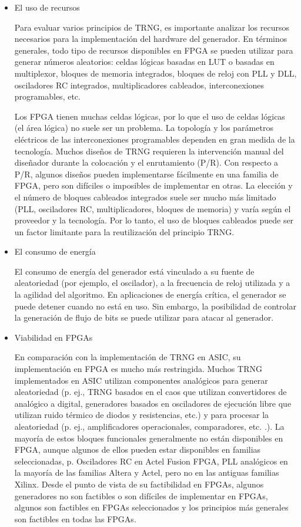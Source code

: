 \begin{itemize}
				\item El uso de recursos
				
					Para evaluar varios principios de TRNG, es importante analizar los recursos necesarios para la implementación del hardware del generador. En términos generales, todo tipo de recursos disponibles en FPGA se pueden utilizar para generar números aleatorios: celdas lógicas basadas en LUT o basadas en multiplexor, bloques de memoria integrados, bloques de reloj con PLL y DLL, osciladores RC integrados, multiplicadores cableados, interconexiones programables, etc.
					
					Los FPGA tienen muchas celdas lógicas, por lo que el uso de celdas lógicas (el área lógica) no suele ser un problema. La topología y los parámetros eléctricos de las interconexiones programables dependen en gran medida de la tecnología. Muchos diseños de TRNG requieren la intervención manual del diseñador durante la colocación y el enrutamiento (P/R). Con respecto a P/R, algunos diseños pueden implementarse fácilmente en una familia de FPGA, pero son difíciles o imposibles de implementar en otras. La elección y el número de bloques cableados integrados suele ser mucho más limitado (PLL, osciladores RC, multiplicadores, bloques de memoria) y varía según el proveedor y la tecnología. Por lo tanto, el uso de bloques cableados puede ser un factor limitante para la reutilización del principio TRNG.
				
				\item El consumo de energía
					
					El consumo de energía del generador está vinculado a su fuente de aleatoriedad (por ejemplo, el oscilador), a la frecuencia de reloj utilizada y a la agilidad del algoritmo. En aplicaciones de energía crítica, el generador se puede detener cuando no está en uso. Sin embargo, la posibilidad de controlar la generación de flujo de bits se puede utilizar para atacar al generador.
					
				\item Viabilidad en FPGAs
				
					En comparación con la implementación de TRNG en ASIC, su implementación en FPGA es mucho más restringida. Muchos TRNG implementados en ASIC utilizan componentes analógicos para generar aleatoriedad (p. ej., TRNG basados en el caos que utilizan convertidores de analógico a digital, generadores basados en osciladores de ejecución libre que utilizan ruido térmico de diodos y resistencias, etc.) y para procesar la aleatoriedad (p. ej., amplificadores operacionales, comparadores, etc. .). La mayoría de estos bloques funcionales generalmente no están disponibles en FPGA, aunque algunos de ellos pueden estar disponibles en familias seleccionadas, p. Osciladores RC en Actel Fusion FPGA, PLL analógicos en la mayoría de las familias Altera y Actel, pero no en las antiguas familias Xilinx. Desde el punto de vista de su factibilidad en FPGAs, algunos generadores no son factibles o son difíciles de implementar en FPGAs, algunos son factibles en FPGAs seleccionados y los principios más generales son factibles en todas las FPGAs.
				

\end{itemize}
